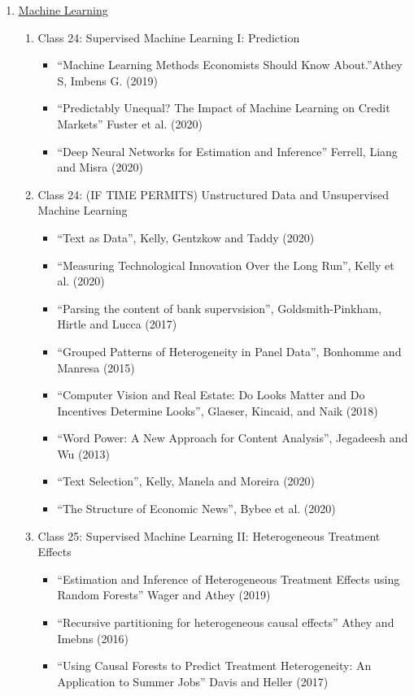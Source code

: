 \documentclass[11pt, a4paper]{article}
\begin{document}
\begin{enumerate}
\item \underline{Machine Learning}
  \begin{enumerate}
  \item Class 24: Supervised Machine Learning I: Prediction
    \begin{itemize}
    \item ``Machine Learning Methods Economists Should Know About.''Athey S, Imbens G.  (2019)
    \item ``Predictably Unequal? The Impact of Machine Learning on Credit Markets'' Fuster et al. (2020)
    \item ``Deep Neural Networks for Estimation and Inference'' Ferrell, Liang and Misra (2020)
    \end{itemize}
  \item Class 24: (IF TIME PERMITS) Unstructured Data and Unsupervised Machine Learning 
    \begin{itemize}
    \item ``Text as Data'', Kelly, Gentzkow and Taddy (2020)
    \item ``Measuring Technological Innovation Over the Long Run'', Kelly et al. (2020)
    \item ``Parsing the content of bank supervsision'', Goldsmith-Pinkham, Hirtle and Lucca (2017)
    \item ``Grouped Patterns of Heterogeneity in Panel Data'', Bonhomme and Manresa (2015)
    \item ``Computer Vision and Real Estate: Do Looks Matter and Do Incentives Determine Looks'', Glaeser, Kincaid, and Naik (2018)
    \item ``Word Power: A New Approach for Content Analysis'', Jegadeesh and Wu (2013)
    \item ``Text Selection'', Kelly, Manela and Moreira (2020)
    \item ``The Structure of Economic News'', Bybee et al. (2020)
    \end{itemize}
  \item Class 25: Supervised Machine Learning II: Heterogeneous Treatment Effects
    \begin{itemize}
    \item ``Estimation and Inference of Heterogeneous Treatment Effects using Random Forests'' Wager and Athey (2019)
    \item ``Recursive partitioning for heterogeneous causal effects'' Athey and Imebns (2016)
    \item ``Using Causal Forests to Predict Treatment Heterogeneity:  An Application to Summer Jobs'' Davis and Heller (2017)

\end{itemize}
\end{enumerate}
\end{enumerate}
\end{document}
